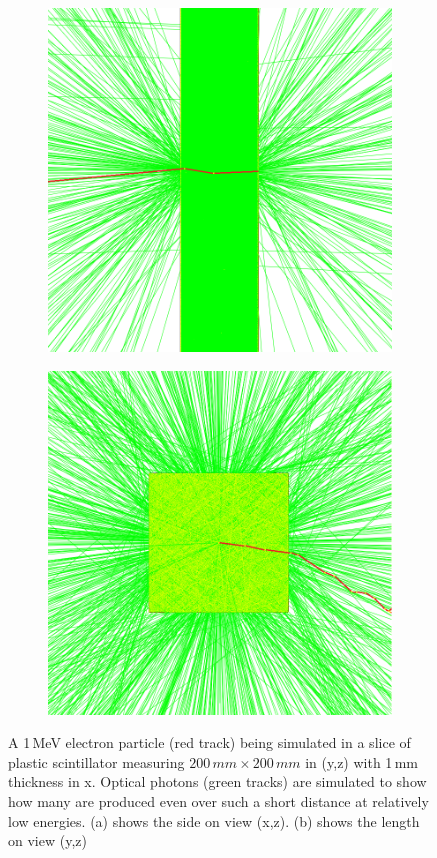 \begin{figure}[!h]
\centering
\begin{subfigure}{.5\textwidth}
  \centering
  \includegraphics[width=0.7\linewidth]{Chapter4/Figs/Raster/lengthOnViewSliceElectron780Square.png}
  \captionsetup{width=.9\linewidth}
  \caption{}
  \label{subFig:lengthOnViewSliceElectron780Square}
\end{subfigure}%
\begin{subfigure}{.5\textwidth}
  \centering
  \includegraphics[width=0.7\linewidth]{Chapter4/Figs/Raster/sideOnViewSliceElectron780Square.png}
  \captionsetup{width=.9\linewidth}
  \caption{}
  \label{subFig:sideOnViewSliceElectron780Square}
\end{subfigure}
\caption[A 1\,MeV particle being simulated in a slice of scintillator.]{A 1\,MeV electron particle (red track) being simulated in a slice of plastic scintillator measuring $200\,mm \times 200\,mm$ in (y,z) with 1\,mm thickness in x. Optical photons (green tracks) are simulated to show how many are produced even over such a short distance at relatively low energies. (a) shows the side on view (x,z). (b) shows the length on view (y,z)}
\label{fig:lengthAndSideViewSliceElectron780Square}
\end{figure}

